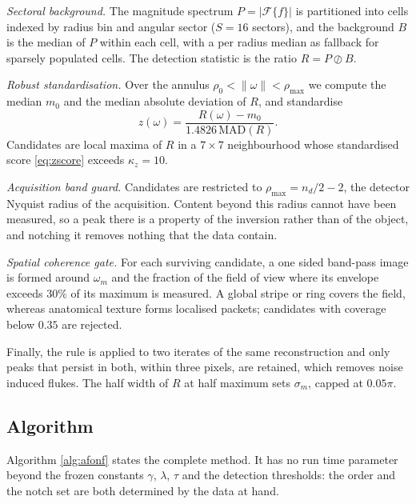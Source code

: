 \emph{Sectoral background.} The magnitude spectrum
$P=|\mathcal{F}\{f\}|$ is partitioned into cells indexed by radius bin and
angular sector ($S=16$ sectors), and the background $B$ is the median of $P$
within each cell, with a per radius median as fallback for sparsely
populated cells. The detection statistic is the ratio $R=P\oslash B$.

\emph{Robust standardisation.} Over the annulus
$\rho_{0}<\|\omega\|<\rho_{\max}$ we compute the median $m_{0}$ and the
median absolute deviation of $R$, and standardise
\begin{equation}
  z(\omega)=\frac{R(\omega)-m_{0}}{1.4826\,\mathrm{MAD}(R)} .
  \label{eq:zscore}
\end{equation}
Candidates are local maxima of $R$ in a $7\times 7$ neighbourhood whose
standardised score \eqref{eq:zscore} exceeds $\kappa_{z}=10$.

\emph{Acquisition band guard.} Candidates are restricted to
$\rho_{\max}=n_{d}/2-2$, the detector Nyquist radius of the acquisition.
Content beyond this radius cannot have been measured, so a peak there is a
property of the inversion rather than of the object, and notching it removes
nothing that the data contain.

\emph{Spatial coherence gate.} For each surviving candidate, a one sided
band-pass image is formed around $\omega_{m}$ and the fraction of the field
of view where its envelope exceeds $30\%$ of its maximum is measured. A
global stripe or ring covers the field, whereas anatomical texture forms
localised packets; candidates with coverage below $0.35$ are rejected.

Finally, the rule is applied to two iterates of the same reconstruction and
only peaks that persist in both, within three pixels, are retained, which
removes noise induced flukes. The half width of $R$ at half maximum sets
$\sigma_{m}$, capped at $0.05\pi$.

\subsection{Algorithm}
\label{sec:algorithm}

Algorithm \ref{alg:afonf} states the complete method. It has no run time
parameter beyond the frozen constants $\gamma$, $\lambda$, $\tau$ and the
detection thresholds: the order and the notch set are both determined by the
data at hand.

